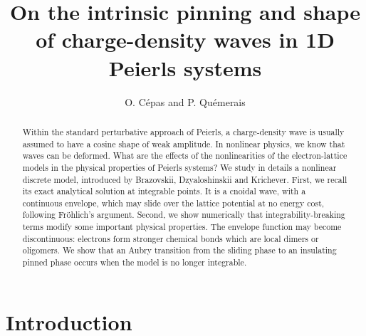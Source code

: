 \documentclass[]{revtex4-1}
\begin{document}
\title{On the intrinsic pinning and shape of charge-density waves  in 1D Peierls systems}
\author{
O. C\'epas and P. Qu\'emerais}


\begin{abstract}
    Within the standard perturbative approach of Peierls, a
    charge-density wave is usually assumed to have a cosine shape of
    weak amplitude. In nonlinear physics, we know that waves can be
    deformed.  What are the effects of the nonlinearities of the
    electron-lattice models in the physical properties of Peierls
    systems? We study in details a nonlinear discrete model,
    introduced by Brazovskii, Dzyaloshinskii and Krichever. First,
    we recall its exact analytical solution at integrable points. It is a
    cnoidal wave, with a continuous envelope, which may slide over the
    lattice potential at no energy cost, following Fr\"ohlich's argument.
     Second, we show numerically that
    integrability-breaking terms modify some important physical properties. The envelope function may become discontinuous:
    electrons form stronger chemical bonds which are local dimers or oligomers.
        We show that an Aubry
    transition  from the sliding phase to an insulating pinned phase occurs when the model is no longer integrable. \end{abstract}


\maketitle
\tableofcontents



\section{Introduction}
\end{document}
